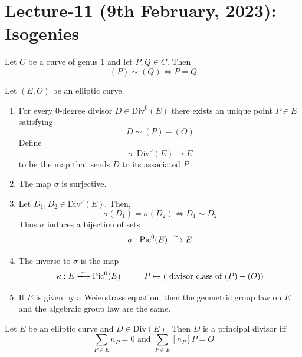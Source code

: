 \documentclass[oneside, 12pt]{scrbook}
\theoremstyle{theorem}
\begin{document}
\chapter{Lecture-11 (9th February, 2023): Isogenies}

\begin{lemma}
Let $C$ be a curve of genus $1$ and let $P,Q \in C$. Then 
\begin{equation}
(P) \sim (Q) \Leftrightarrow P = Q
\end{equation}
\end{lemma}

\begin{proposition}
Let $(E,O)$ be an elliptic curve. 
\begin{enumerate}
\item For every $0$-degree divisor $D \in \mathrm{Div}^{0}(E)$ there exists an unique point $P \in E$ satisfying 
\begin{equation}
D \sim (P)-(O)
\end{equation}
Define 
\begin{equation}
\sigma : \mathrm{Div}^{0}(E) \rightarrow E
\end{equation}
to be the map that sends $D$ to its associated $P$
\item The map $\sigma $ is surjective.
\item Let $D_{1},D_{2} \in \mathrm{Div}^{0}(E)$. Then, 
\begin{equation}
\sigma (D_{1}) = \sigma (D_{2}) \Leftrightarrow D_{1} \sim D_{2}
\end{equation}
Thus $\sigma$ induces a bijection of sets 
\begin{equation}
\sigma : \mathrm{Pic}^{0}(E) \xlongrightarrow{\sim} E
\end{equation}
\item The inverse to $\sigma$ is the map 
\begin{equation}
\kappa : E \xlongrightarrow{\sim} \mathrm{Pic}^{0}(E) \hspace{1cm} P \mapsto (\text{ divisor class of } (P) - (O))
\end{equation}
\item If $E$ is given by a Weierstrass equation, then the geometric group law on $E$ and the algebraic group law are the same.
\end{enumerate}
\end{proposition}

\begin{corollary}
Let $E$ be an elliptic curve and $D \in \mathrm{Div}(E)$. Then $D$ is a principal divisor iff 
\begin{equation}
\sum_{P \in E} n_{P} = 0 \text{ and } \sum_{P \in E} [n_{P}]P= O
\end{equation}
\end{corollary}
\end{document}
